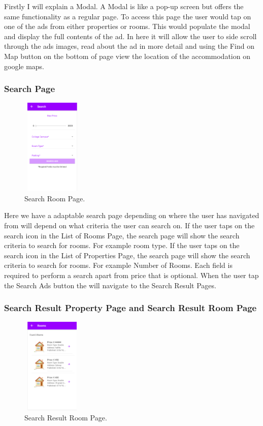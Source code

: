Firstly I will explain a Modal. A Modal is like a pop-up screen but offers the same functionality as a regular page. To access this page the user would tap on one of the ads from either properties or rooms. This would populate the modal and display the full contents of the ad. In here it will allow the user to side scroll through the ads images, read about the ad in more detail and using the Find on Map button on the bottom of page view the location of the accommodation on google maps.

\subsubsection{Search Page}

\begin{figure}[h]
\centering
\includegraphics[width=2.9cm, height=4.6cm]{img/searchRoom}
\caption{Search Room Page.}
\end{figure}

Here we have a adaptable search page depending on where the user has navigated from will depend on what criteria the user can search on. If the user taps on the search icon in the List of Rooms Page, the search page will show the search criteria to search for rooms. For example room type. If the user taps on the search icon in the List of Properties Page, the search page will show the search criteria to search for rooms. For example Number of Rooms. Each field is required  to perform a search apart from price that is optional. When the user tap the Search Ads button the will navigate to the Search Result Pages.

\subsubsection{Search Result Property Page and Search Result Room Page}

\begin{figure}[h]
\centering
\includegraphics[width=2.9cm, height=4.6cm]{img/searchResult}
\caption{Search Result Room Page.}
\end{figure}


